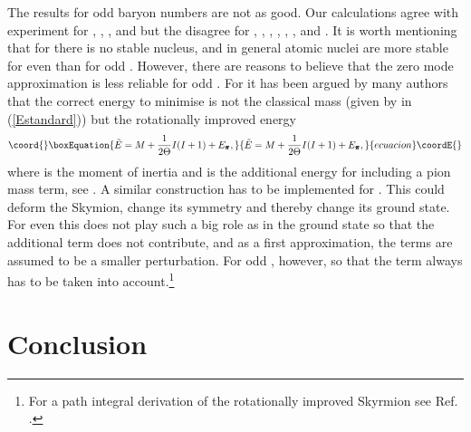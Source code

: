 \documentclass[a4paper,12pt]{article}
\def\vecpi{{\pmb{\pi}}}
\begin{document}
The results for odd baryon numbers are not as good.
Our calculations agree with experiment for \coordHE{}, \coordHE{}, \coordHE{}, and \coordHE{} but 
the disagree for \coordHE{}, \coordHE{}, \coordHE{}, \coordHE{}, \coordHE{}, \coordHE{}, and \coordHE{}.
It is worth mentioning that for \coordHE{} there is no stable nucleus, and 
in general atomic nuclei are more stable for even \coordHE{} than for odd \coordHE{}.
%
However, there are reasons to believe that the zero mode 
approximation is less reliable for odd \coordHE{}. 
For \coordHE{} it has been argued by many authors 
that the correct energy to minimise is not the classical mass \coordHE{} (given 
by \coordHE{} in (\ref{Estandard})) but the rotationally improved energy 
%
\begin{equation}\coord{}\boxEquation{
{\tilde E} = M + \frac{1}{2 \Theta} I(I+1) + E_{\vecpi},
}{
{\tilde E} = M + \frac{1}{2 \Theta} I(I+1) + E_{\vecpi},
}{ecuacion}\coordE{}\end{equation}
%
where \myHighlight{$\Theta$}\coordHE{} is the moment of inertia and \myHighlight{$E_{\vecpi}$}\coordHE{} is the 
additional energy for including a pion mass term, see 
\cite{Rajaraman:1986ty}. A similar construction 
has to be implemented for \coordHE{}. This could deform the 
Skymion, change its symmetry and thereby change its ground state.
For even \coordHE{} this does not play such a big role as \coordHE{} in the 
ground state so that the additional term does not contribute, and
as a first approximation, the \coordHE{} terms are assumed to be a smaller 
perturbation. For odd \coordHE{}, however, \coordHE{} so that the term 
always has to be taken into account.\footnote{For a path integral 
derivation of the rotationally improved Skyrmion see Ref. 
\cite{Dorey:1994fk}.} 


\section{Conclusion}
\end{document}
